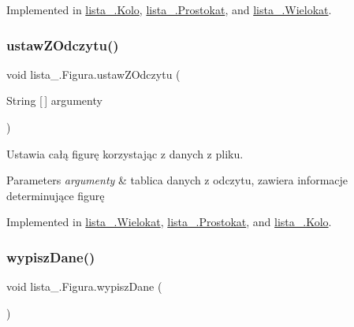 Implemented in \mbox{\hyperlink{classlista__5_1_1_kolo_a97e188acce92c4ca26f1e5483370b00f}{lista\+\_.\+Kolo}}, \mbox{\hyperlink{classlista__5_1_1_prostokat_ad63e4a8c7f291a54f8c9c285c8e6c8ff}{lista\+\_.\+Prostokat}}, and \mbox{\hyperlink{classlista__5_1_1_wielokat_a0c33c8213f6796d16aac592f2a961768}{lista\+\_.\+Wielokat}}.

\mbox{\label{interfacelista__5_1_1_figura_a75b72b51014348d839e1f2b81525f264}} 
\subsubsection{\texorpdfstring{ustaw\+Z\+Odczytu()}{ustawZOdczytu()}}
{\footnotesize\ttfamily void lista\+\_.\+Figura.\+ustaw\+Z\+Odczytu (\begin{DoxyParamCaption}\item[{String \mbox{[}$\,$\mbox{]}}]{argumenty }\end{DoxyParamCaption})}

Ustawia całą figurę korzystając z danych z pliku. 
\begin{DoxyParams}{Parameters}
{\em argumenty} & tablica danych z odczytu, zawiera informacje determinujące figurę \\
\hline
\end{DoxyParams}


Implemented in \mbox{\hyperlink{classlista__5_1_1_wielokat_a8427c86e5be650cbece5464eee1ac053}{lista\+\_.\+Wielokat}}, \mbox{\hyperlink{classlista__5_1_1_prostokat_a93ae9f652ca00886c05be661b17a0886}{lista\+\_.\+Prostokat}}, and \mbox{\hyperlink{classlista__5_1_1_kolo_ad4c6dbc8f29699d8753272098719186e}{lista\+\_.\+Kolo}}.

\mbox{\label{interfacelista__5_1_1_figura_aaddd90c61fd1632655cb031efafe1a7d}} 
\subsubsection{\texorpdfstring{wypisz\+Dane()}{wypiszDane()}}
{\footnotesize\ttfamily void lista\+\_.\+Figura.\+wypisz\+Dane (\begin{DoxyParamCaption}{ }\end{DoxyParamCaption})}

